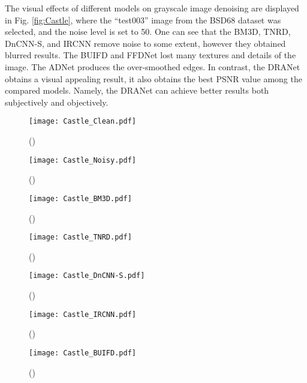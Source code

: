 \documentclass[3p,times]{elsarticle}
\begin{document}
The visual effects of different models on grayscale image denoising are displayed in Fig. \ref{fig:Castle}, where the ``test003'' image from the BSD68 dataset was selected, and the noise level is set to 50. One can see that the BM3D, TNRD, DnCNN-S, and IRCNN remove noise to some extent, however they obtained blurred results. The BUIFD and FFDNet lost many textures and details of the image. The ADNet produces the over-smoothed edges. In contrast, the DRANet obtains a visual appealing result, it also obtains the best PSNR value among the compared models. Namely, the DRANet can achieve better results both subjectively and objectively.

\begin{figure*}[htbp]
	\centering
    \captionsetup[subfigure]{labelformat=empty}
	\begin{subfigure}{0.18\linewidth}
		\centering
		\texttt{[image: Castle\_Clean.pdf]}
		\caption{()}
	\end{subfigure}
    \centering
	\begin{subfigure}{0.18\linewidth}
		\centering
		\texttt{[image: Castle\_Noisy.pdf]}
		\caption{()}
	\end{subfigure}
    \centering
	\begin{subfigure}{0.18\linewidth}
		\centering
		\texttt{[image: Castle\_BM3D.pdf]}
		\caption{()}
	\end{subfigure}
    \centering
	\begin{subfigure}{0.18\linewidth}
		\centering
		\texttt{[image: Castle\_TNRD.pdf]}
		\caption{()}
	\end{subfigure}
    \centering
	\begin{subfigure}{0.18\linewidth}
		\centering
		\texttt{[image: Castle\_DnCNN-S.pdf]}
		\caption{()}
	\end{subfigure}
    \centering
	\begin{subfigure}{0.18\linewidth}
		\centering
		\texttt{[image: Castle\_IRCNN.pdf]}
		\caption{()}
	\end{subfigure}
    \centering
	\begin{subfigure}{0.18\linewidth}
		\centering
		\texttt{[image: Castle\_BUIFD.pdf]}
		\caption{()}
	\end{subfigure}
    \centering
	\begin{subfigure}{0.18\linewidth}

\end{subfigure}
\end{figure*}
\end{document}
